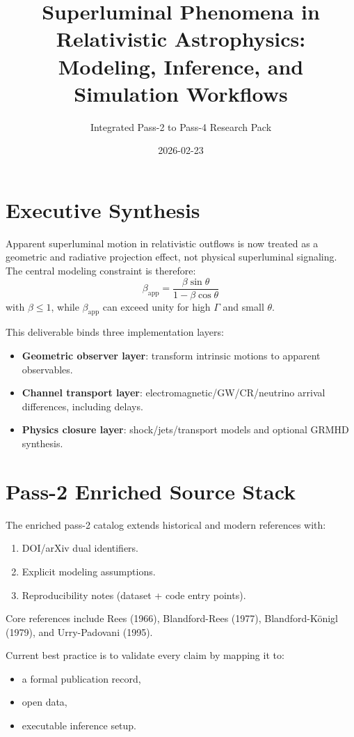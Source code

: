 \documentclass[11pt, oneside]{book}
\title{Superluminal Phenomena in Relativistic Astrophysics:\\
Modeling, Inference, and Simulation Workflows}
\author{Integrated Pass-2 to Pass-4 Research Pack}
\date{2026-02-23}
\begin{document}
\frontmatter
\maketitle
\tableofcontents

\chapter{Executive Synthesis}
Apparent superluminal motion in relativistic outflows is now treated as a geometric and radiative projection effect, not physical superluminal signaling. The central modeling constraint is therefore:
\begin{equation}
\beta_{\mathrm{app}} = \frac{\beta \sin\theta}{1-\beta\cos\theta}
\end{equation}
with \(\beta\le 1\), while \(\beta_{\mathrm{app}}\) can exceed unity for high \(\Gamma\) and small \(\theta\).  

This deliverable binds three implementation layers:
\begin{itemize}
  \item \textbf{Geometric observer layer}: transform intrinsic motions to apparent observables.
  \item \textbf{Channel transport layer}: electromagnetic/GW/CR/neutrino arrival differences, including delays.
  \item \textbf{Physics closure layer}: shock/jets/transport models and optional GRMHD synthesis.
\end{itemize}

\mainmatter
\chapter{Pass-2 Enriched Source Stack}
The enriched pass-2 catalog extends historical and modern references with:
\begin{enumerate}
  \item DOI/arXiv dual identifiers.
  \item Explicit modeling assumptions.
  \item Reproducibility notes (dataset + code entry points).
\end{enumerate}
Core references include Rees (1966), Blandford-Rees (1977), Blandford-K{\"o}nigl (1979), and Urry-Padovani (1995).  

Current best practice is to validate every claim by mapping it to:
\begin{itemize}
  \item a formal publication record,
  \item open data,
  \item executable inference setup.
\end{itemize}
\end{document}

